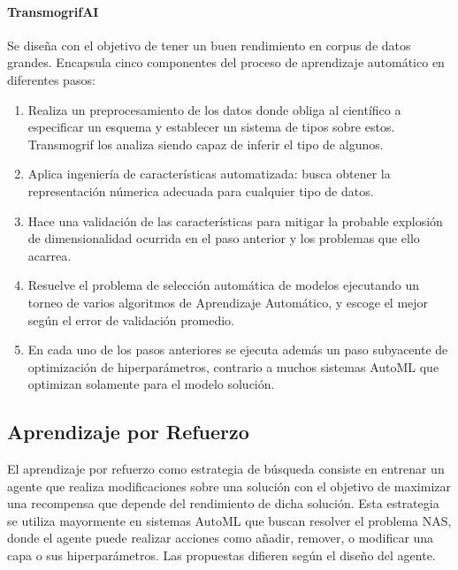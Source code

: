         \paragraph{TransmogrifAI }  Se dise\~na con el objetivo de tener un buen rendimiento en corpus de datos grandes. Encapsula cinco componentes del proceso de aprendizaje autom\'atico en diferentes pasos:
        \begin{enumerate}
            \item Realiza un preprocesamiento de los datos donde obliga al cient\'ifico a especificar un esquema y establecer un sistema de tipos sobre estos. Transmogrif los analiza siendo capaz de inferir el tipo de algunos.
            \item Aplica ingenier\'ia de caracter\'isticas automatizada: busca obtener la representaci\'on n\'umerica adecuada para cualquier tipo de datos.
            \item Hace una validaci\'on de las caracter\'isticas para mitigar la probable explosi\'on de dimensionalidad ocurrida en el paso anterior y los problemas que ello acarrea.
            \item Resuelve el problema de selecci\'on autom\'atica de modelos ejecutando un torneo de varios algoritmos de Aprendizaje Autom\'atico, y escoge el mejor seg\'un el error de validaci\'on promedio.
            \item En cada uno de los pasos anteriores se ejecuta adem\'as un paso subyacente de optimizaci\'on de hiperpar\'ametros, contrario a  muchos sistemas AutoML que optimizan solamente para el modelo soluci\'on. 
        \end{enumerate}


\subsection{Aprendizaje por Refuerzo}
El aprendizaje por refuerzo como estrategia de b\'usqueda consiste en entrenar un agente que realiza modificaciones sobre una soluci\'on con el objetivo de maximizar una recompensa que depende del rendimiento de dicha soluci\'on. Esta estrategia se utiliza mayormente en sistemas AutoML que buscan resolver el problema NAS, donde el agente puede realizar acciones como a\~nadir, remover, o modificar una capa o sus hiperpar\'ametros. Las propuestas difieren seg\'un el dise\~no del agente.

